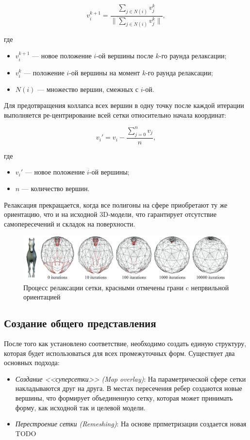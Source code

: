 	\begin{equation}
		v_i^{k + 1} = \frac{\sum_{j \in N(i)} v_j^{k}}{\parallel \sum_{j \in N(i)} v_j^{k} \parallel}, 
	\end{equation}
	
	где
	\begin{itemize}
		\item $v_i^{k + 1}$ --- новое положение $i$-ой вершины после $k$-го раунда релаксации;
		\item $v_i^{k}$ --- положение $i$-ой вершины на момент $k$-го раунда релаксации;
		\item $N(i)$ --- множество вершин, смежных с $i$-ой.
	\end{itemize}
	
	Для предотвращения коллапса всех вершин в одну точку после каждой итерации выполняется ре-центрирование всей сетки относительно начала координат:
	
	\begin{equation}
		v_i' = v_i - \frac{\sum_{j = 0}^{n} v_j}{n},
	\end{equation}
	
	где
	\begin{itemize}
		\item $v_i'$ --- новое положение $i$-ой вершины;
		\item $n$ --- количество вершин.
	\end{itemize}
	
	Релаксация прекращается, когда все полигоны на сфере приобретают ту же ориентацию, что и на исходной 3D-модели, что гарантирует отсутствие самопересечений и складок на поверхности.
	
	
	\begin{figure}[H]
		\centering
		\includegraphics[width=\textwidth]{../inc/images/relaxation}
		\caption{Процесс релаксации сетки, красными отмечены грани c непрвильной ориентацией}
		\label{fig:relaxation}
	\end{figure}
	
	
    \subsection{Создание общего представления}
    После того как установлено соответствие, необходимо создать единую структуру, которая будет использоваться для всех промежуточных форм. Существует два основных подхода:
    \begin{itemize}
        \item \textit{Создание <<суперсетки>> (Map overlay)}\cite{Alexa}: На параметрической сфере сетки накладываются друг на друга. В местах пересечения ребер создаются новые вершины, что формирует объединенную сетку, которая может принимать форму, как исходной так и целевой модели.
        \item \textit{Перестроение сетки (Remeshing)}\cite{Alexa}: На основе прпметризации создается новая TODO
    \end{itemize}

